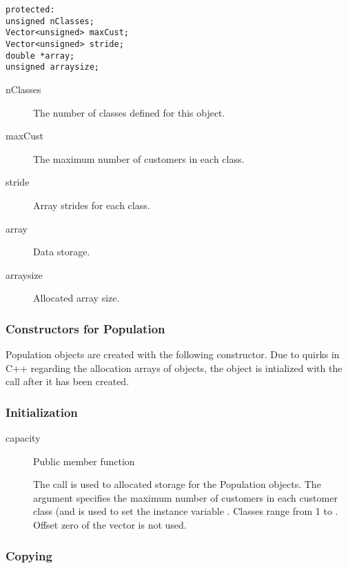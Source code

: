 \begin{verbatim}
protected:
unsigned nClasses;
Vector<unsigned> maxCust;
Vector<unsigned> stride;
double *array;
unsigned arraysize;
\end{verbatim}

\begin{description}
\item[nClasses] \texonly{---} The number of classes defined for this
   object.
\item[maxCust] \texonly{---} The maximum number of customers in each class.
\item[stride] \texonly{---} Array strides for each class.
\item[array] \texonly{---} Data storage.
\item[arraysize] \texonly{---} Allocated array size.
\end{description}

\subsubsection{Constructors for Population}

Population objects are created with the following constructor.  Due to
quirks in C++ regarding the allocation arrays of objects, the object
is intialized with the  call after it has been
created.


\subsubsection{Initialization}

\begin{description}
\item[capacity] \texonly{---} Public member function\\
  \label{sec:population-capacity}

  The  call is used to allocated storage for the
  Population objects.  The argument  specifies the maximum number
  of customers in each customer class (and is used to set the instance
  variable .  Classes range
  from 1 to .  Offset zero of
  the vector  is not used.
\end{description}


\subsubsection{Copying}
\label{sec:population-copy}

